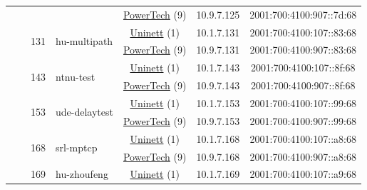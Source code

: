 \begin{small}
\begin{center}
\begin{longtable}{|c|c|c|c|c|c|c|c|}
  &  &  &  & \multicolumn{2}{|c|}{\tiny{\href{http://www.powertech.no}{PowerTech} (9)}} & \tiny{10.9.7.125} & \tiny{2001:700:4100:907::7d:68} \\* \cline{3-3}\cline{4-4}\cline{5-5}\cline{6-6}\cline{7-7}\cline{8-8}
  &  & \multirow{2}{*}{\tiny{131}} & \multicolumn{1}{|l|}{\multirow{2}{*}{\tiny{hu-multipath}}} & \multicolumn{2}{|c|}{\tiny{\href{https://www.uninett.no}{Uninett} (1)}} & \tiny{10.1.7.131} & \tiny{2001:700:4100:107::83:68} \\* \cline{5-5}\cline{6-6}\cline{7-7}\cline{8-8}
  &  &  &  & \multicolumn{2}{|c|}{\tiny{\href{http://www.powertech.no}{PowerTech} (9)}} & \tiny{10.9.7.131} & \tiny{2001:700:4100:907::83:68} \\* \cline{3-3}\cline{4-4}\cline{5-5}\cline{6-6}\cline{7-7}\cline{8-8}
  &  & \multirow{2}{*}{\tiny{143}} & \multicolumn{1}{|l|}{\multirow{2}{*}{\tiny{ntnu-test}}} & \multicolumn{2}{|c|}{\tiny{\href{https://www.uninett.no}{Uninett} (1)}} & \tiny{10.1.7.143} & \tiny{2001:700:4100:107::8f:68} \\* \cline{5-5}\cline{6-6}\cline{7-7}\cline{8-8}
  &  &  &  & \multicolumn{2}{|c|}{\tiny{\href{http://www.powertech.no}{PowerTech} (9)}} & \tiny{10.9.7.143} & \tiny{2001:700:4100:907::8f:68} \\* \cline{3-3}\cline{4-4}\cline{5-5}\cline{6-6}\cline{7-7}\cline{8-8}
  &  & \multirow{2}{*}{\tiny{153}} & \multicolumn{1}{|l|}{\multirow{2}{*}{\tiny{ude-delaytest}}} & \multicolumn{2}{|c|}{\tiny{\href{https://www.uninett.no}{Uninett} (1)}} & \tiny{10.1.7.153} & \tiny{2001:700:4100:107::99:68} \\* \cline{5-5}\cline{6-6}\cline{7-7}\cline{8-8}
  &  &  &  & \multicolumn{2}{|c|}{\tiny{\href{http://www.powertech.no}{PowerTech} (9)}} & \tiny{10.9.7.153} & \tiny{2001:700:4100:907::99:68} \\* \cline{3-3}\cline{4-4}\cline{5-5}\cline{6-6}\cline{7-7}\cline{8-8}
  &  & \multirow{2}{*}{\tiny{168}} & \multicolumn{1}{|l|}{\multirow{2}{*}{\tiny{srl-mptcp}}} & \multicolumn{2}{|c|}{\tiny{\href{https://www.uninett.no}{Uninett} (1)}} & \tiny{10.1.7.168} & \tiny{2001:700:4100:107::a8:68} \\* \cline{5-5}\cline{6-6}\cline{7-7}\cline{8-8}
  &  &  &  & \multicolumn{2}{|c|}{\tiny{\href{http://www.powertech.no}{PowerTech} (9)}} & \tiny{10.9.7.168} & \tiny{2001:700:4100:907::a8:68} \\* \cline{3-3}\cline{4-4}\cline{5-5}\cline{6-6}\cline{7-7}\cline{8-8}
  &  & \multirow{2}{*}{\tiny{169}} & \multicolumn{1}{|l|}{\multirow{2}{*}{\tiny{hu-zhoufeng}}} & \multicolumn{2}{|c|}{\tiny{\href{https://www.uninett.no}{Uninett} (1)}} & \tiny{10.1.7.169} & \tiny{2001:700:4100:107::a9:68} \\* \cline{5-5}\cline{6-6}\cline{7-7}\cline{8-8}

\end{longtable}
\end{center}
\end{small}
